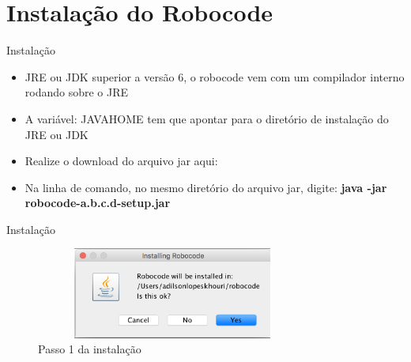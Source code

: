 %
%
%
%			



\section{Instalação do Robocode}

\begin{frame}
	\begin{block}{Instalação}
		\begin{itemize}
			\item JRE ou JDK superior a versão 6, o robocode vem com um compilador interno rodando sobre o JRE

			\item A variável: JAVA\textunderscore HOME tem que apontar para o diretório de instalação do JRE ou JDK
			
			\item Realize o download do arquivo jar aqui: \href{https://sourceforge.net/projects/robocode/files/robocode/1.9.3.4/}{\color{blue}{Source Forge}} 
			
			\item Na linha de comando, no  mesmo diretório do arquivo jar, digite: \textbf{java -jar robocode-a.b.c.d-setup.jar}
						
		\end{itemize}
	\end{block}
\end{frame}


\begin{frame}
	\begin{block}{Instalação}
		 \begin{figure}[!htb]
			\centering	  				
			\includegraphics[height=3cm, width = 9cm]{./pic/instalacao01.png}
			\caption{Passo 1 da instalação}
			\label{fig_instalacao01}
		\end{figure}
	\end{block}
\end{frame}


